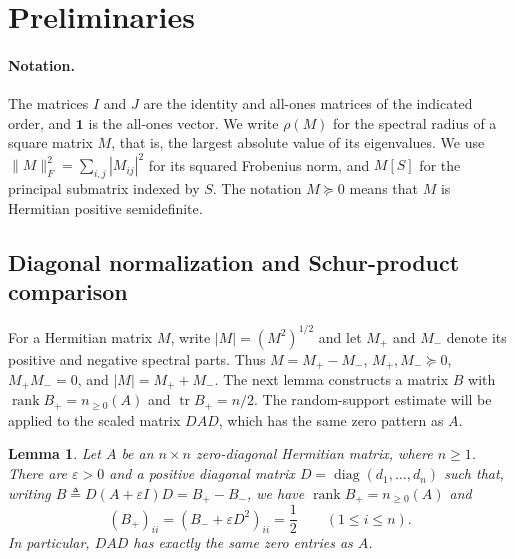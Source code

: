 \documentclass[11pt]{article}
\numberwithin{equation}{section}
\newtheorem{lemma}[theorem]{Lemma}
\theoremstyle{definition}
\theoremstyle{remark}
\DeclareMathOperator{\tr}{tr}
\DeclareMathOperator{\rank}{rank}
\DeclareMathOperator{\diag}{diag}
\newcommand{\one}{\mathbf 1}
\begin{document}
\section{Preliminaries}\label{sec:preliminaries}

\paragraph{Notation.}
The matrices $I$ and $J$ are the identity and all-ones matrices
of the indicated order, and $\one$ is the all-ones vector.
We write $\rho(M)$ for the spectral radius of a square matrix $M$,
that is, the largest absolute value of its eigenvalues.
We use $\|M\|_F^2=\sum_{i,j}|M_{ij}|^2$ for its squared Frobenius norm,
and $M[S]$ for the principal submatrix indexed by $S$.
The notation $M\succeq0$ means that $M$ is Hermitian positive
semidefinite.

\subsection{Diagonal normalization and Schur-product comparison}\label{sec:normalization}

For a Hermitian matrix $M$, write $|M|=(M^2)^{1/2}$ and let
$M_+$ and $M_-$ denote its positive and negative spectral parts.
Thus $M=M_+-M_-$, $M_+,M_-\succeq0$, $M_+M_-=0$, and
$|M|=M_++M_-$.
The next lemma constructs a matrix $B$ with
$\rank B_+=n_{\geq0}(A)$ and $\tr B_+=n/2$.
The random-support estimate will be applied to the scaled matrix
$DAD$, which has the same zero pattern as $A$.

\begin{lemma}\label{lem:balance}
Let $A$ be an $n\times n$ zero-diagonal Hermitian matrix, where $n\geq1$.
There are $\varepsilon>0$ and a positive diagonal matrix
$D=\diag(d_1,\ldots,d_n)$ such that, writing
$B\triangleq D(A+\varepsilon I)D=B_+-B_-$,
we have $\rank B_+=n_{\geq0}(A)$ and
\begin{equation}\label{eq:balance}
 (B_+)_{ii}=(B_-+\varepsilon D^2)_{ii}=\frac12
 \qquad(1\leq i\leq n).
\end{equation}
In particular, $DAD$ has exactly the same zero entries as $A$.
\end{lemma}
\end{document}
